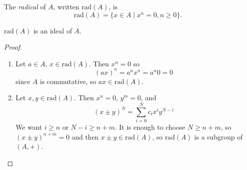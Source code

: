 \begin{defn}[Radical]
The \emph{radical} of $A$, written $\mathrm{rad}(A)$, is
$$
\mathrm{rad}(A) = \{ x \in A \mid x^n = 0, n \geq 0 \}.
$$
\end{defn}

\begin{prop}
$\mathrm{rad}(A)$ is an ideal of $A$.
\end{prop}
\begin{proof}
\begin{enumerate}
  \item{
    Let $a \in A$, $x \in \mathrm{rad}(A)$. Then $x^n = 0$ so
    $$
    (ax)^n = a^n x^n = a^n 0 = 0
    $$
    since $A$ is commutative, so $ax \in \mathrm{rad}(A)$.
  }
  \item{
    Let $x, y \in \mathrm{rad}(A)$. Then $x^n = 0$, $y^m = 0$, and
    $$
    (x \pm y)^N = \sum_{i=0}^N c_i x^i y^{N-i}
    $$
    We want $i \geq n$ or $N - i \geq n + m$. It is enough to choose
    $N \geq n + m$, so $(x \pm y)^{n + m} = 0$ and then $x \pm y \in
    \mathrm{rad}(A)$, so $\mathrm{rad}(A)$ is a subgroup of
    $(A, +)$.
  }
\end{enumerate}
\end{proof}

